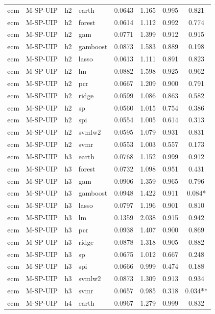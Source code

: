 \begin{ThreePartTable}
\begin{longtable}[t]{llclcccc}
\addlinespace
ecm & M-SP-UIP & h2 & earth & 0.0643 & 1.165 & 0.995 & 0.821\\
ecm & M-SP-UIP & h2 & forest & 0.0614 & 1.112 & 0.992 & 0.774\\
ecm & M-SP-UIP & h2 & gam & 0.0771 & 1.399 & 0.912 & 0.915\\
ecm & M-SP-UIP & h2 & gamboost & 0.0873 & 1.583 & 0.889 & 0.198\\
ecm & M-SP-UIP & h2 & lasso & 0.0613 & 1.111 & 0.891 & 0.823\\
ecm & M-SP-UIP & h2 & lm & 0.0882 & 1.598 & 0.925 & 0.962\\
ecm & M-SP-UIP & h2 & pcr & 0.0667 & 1.209 & 0.900 & 0.791\\
ecm & M-SP-UIP & h2 & ridge & 0.0599 & 1.086 & 0.863 & 0.582\\
ecm & M-SP-UIP & h2 & sp & 0.0560 & 1.015 & 0.754 & 0.386\\
ecm & M-SP-UIP & h2 & spi & 0.0554 & 1.005 & 0.614 & 0.313\\
ecm & M-SP-UIP & h2 & svmlw2 & 0.0595 & 1.079 & 0.931 & 0.831\\
ecm & M-SP-UIP & h2 & svmr & 0.0553 & 1.003 & 0.557 & 0.173\\
\addlinespace
ecm & M-SP-UIP & h3 & earth & 0.0768 & 1.152 & 0.999 & 0.912\\
ecm & M-SP-UIP & h3 & forest & 0.0732 & 1.098 & 0.951 & 0.431\\
ecm & M-SP-UIP & h3 & gam & 0.0906 & 1.359 & 0.965 & 0.796\\
ecm & M-SP-UIP & h3 & gamboost & 0.0948 & 1.422 & 0.911 & 0.084*\\
ecm & M-SP-UIP & h3 & lasso & 0.0797 & 1.196 & 0.901 & 0.810\\
ecm & M-SP-UIP & h3 & lm & 0.1359 & 2.038 & 0.915 & 0.942\\
ecm & M-SP-UIP & h3 & pcr & 0.0938 & 1.407 & 0.900 & 0.869\\
ecm & M-SP-UIP & h3 & ridge & 0.0878 & 1.318 & 0.905 & 0.882\\
ecm & M-SP-UIP & h3 & sp & 0.0675 & 1.012 & 0.667 & 0.248\\
ecm & M-SP-UIP & h3 & spi & 0.0666 & 0.999 & 0.474 & 0.188\\
ecm & M-SP-UIP & h3 & svmlw2 & 0.0873 & 1.309 & 0.913 & 0.934\\
ecm & M-SP-UIP & h3 & svmr & 0.0657 & 0.985 & 0.318 & 0.034**\\
\addlinespace
ecm & M-SP-UIP & h4 & earth & 0.0967 & 1.279 & 0.999 & 0.832\\

\end{longtable}
\end{ThreePartTable}
